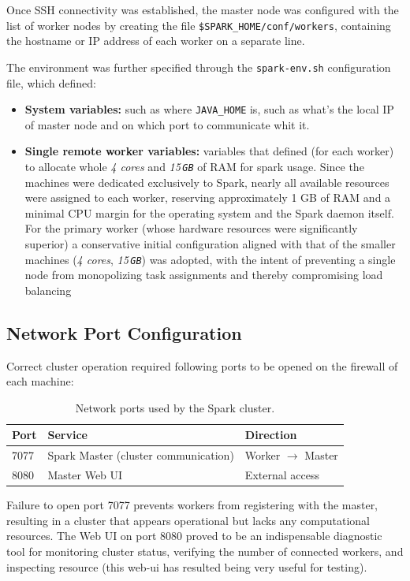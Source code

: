 \documentclass[../main.tex]{subfiles}
\begin{document}
Once SSH connectivity was established, the master node was configured with the list of worker nodes by creating the file \texttt{\$SPARK\_HOME/conf/workers}, containing the hostname or IP address of each worker on a separate line. 

The environment was further specified through the \texttt{spark-env.sh} configuration file, which defined:
\begin{itemize}
    \item \textbf{System variables:} such as where \texttt{JAVA\_HOME} is, such as what's the local IP of master node and on which port to communicate whit it.
    \item \textbf{Single remote worker variables:} variables that defined (for each worker) to allocate whole \textit{4 cores} and \textit{15\,\texttt{GB}} of RAM for spark usage. Since the machines were dedicated exclusively to Spark, nearly all available resources were assigned to each worker, reserving approximately 1 GB of RAM and a minimal CPU margin for the operating system and the Spark daemon itself. For the primary worker (whose hardware resources were significantly superior) a conservative initial configuration aligned with that of the smaller machines (\textit{4 cores}, \textit{15\,\texttt{GB}}) was adopted, with the intent of preventing a single node from monopolizing task assignments and thereby compromising load balancing
\end{itemize}

\subsection{Network Port Configuration}

Correct cluster operation required following ports to be opened on the firewall of each machine:

\begin{table}[H]
\centering
\begin{tabular}{lll}
\toprule
\textbf{Port} & \textbf{Service} & \textbf{Direction} \\
\midrule
7077 & Spark Master (cluster communication) & Worker $\rightarrow$ Master \\
8080 & Master Web UI & External access \\
\bottomrule
\end{tabular}
\caption{Network ports used by the Spark cluster.}
\end{table}

Failure to open port 7077 prevents workers from registering with the master, resulting in a cluster that appears operational but lacks any computational resources. The Web UI on port 8080 proved to be an indispensable diagnostic tool for monitoring cluster status, verifying the number of connected workers, and inspecting resource (this web-ui has resulted being very useful for testing).
\end{document}
